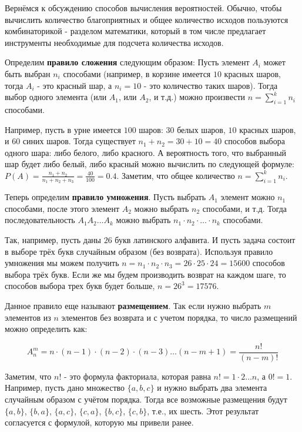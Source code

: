 Вернёмся к обсуждению способов вычисления вероятностей. Обычно, 
чтобы вычислить количество благоприятных и общее количество 
исходов пользуются комбинаторикой - разделом математики, 
который в том числе предлагает инструменты необходимые для 
подсчета количества исходов. 

Определим \textbf{правило сложения} следующим образом:
Пусть элемент $A_i$ может быть выбран $n_i$ способами (например,
в корзине имеется $10$ красных шаров, тогда $A_i$ - это красный шар, а $n_i=10$
- это количество таких шаров). Тогда выбор одного элемента 
(или $A_1$, или $A_2$, и т.д.) можно произвести 
$n = \sum_{i=1}^k n_i$ способами.

Например, пусть в урне имеется $100$ шаров: $30$ белых шаров, $10$
красных шаров, и $60$ синих шаров. Тогда существует 
$n_1 + n_2 = 30 + 10 = 40$ способов выбора одного шара: либо белого, 
либо красного. А вероятность того, что выбранный шар будет либо 
белый, либо красный можно вычислить по следующей формуле:
$P(A)=\frac{n_1+n_2}{n_1+n_2+n_3} = \frac{40}{100} = 0.4$.
Заметим, что общее количество $n=\sum_{i=1}^kn_i$. 

Теперь определим \textbf{правило умножения}. Пусть выбрать $A_1$ элемент можно
$n_1$ способами, после этого элемент $A_2$ можно выбрать $n_2$ способами,
и т.д. Тогда последовательность $A_1 A_2 \ldots A_k$ можно выбрать 
$n_1 \cdot n_2 \cdot \ldots \cdot n_k$ способами.

Так, например, пусть даны $26$ букв латинского алфавита. И пусть задача 
состоит в выборе трёх букв случайным образом (без возврата). Используя правило 
умножения мы можем получить $n=n_1 \cdot n_2 \cdot n_3 = 26 \cdot 25 \cdot 24 = 15600$ 
способов выбора трёх букв. Если же мы будем производить возврат на каждом шаге, то способов
выбора трех букв будет больше, $n=26^3=17576$.

Данное правило еще называют \textbf{размещением}. Так если нужно выбрать $m$ элементов
из $n$ элементов без возврата и с учетом порядка, то число размещений можно определить как:

$$A_n^m=n\cdot(n-1)\cdot(n-2)\cdot(n-3)\ldots(n-m+1)=\frac{n!}{(n-m)!}$$

Заметим, что $n!$ - это формула факториала, которая равна $n!=1\cdot 2 \ldots n$, а $0!=1$.
Например, пусть дано множество $\{a, b, c\}$ и нужно выбрать два элемента случайным образом
с учётом порядка. Тогда все возможные размещения будут $\{a, b\}$, $\{b, a\}$, $\{a, c\}$, 
$\{c, a\}$, $\{b, c\}$, $\{c, b\}$, т.е., их шесть. Этот результат согласуется с 
формулой, которую мы привели ранее. 

